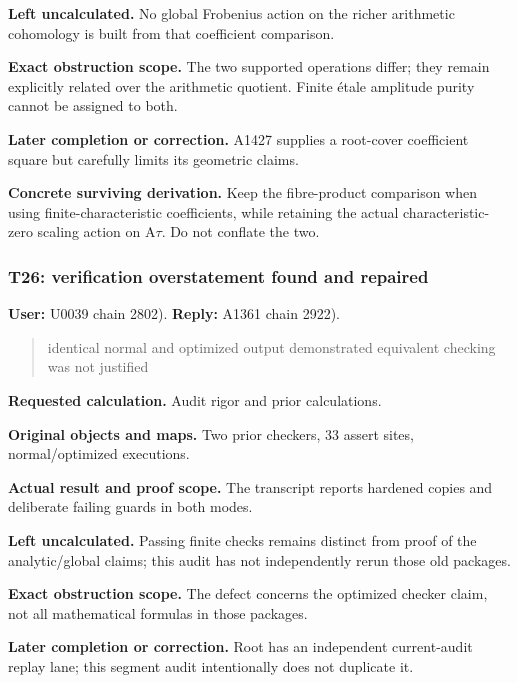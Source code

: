 \textbf{Left uncalculated.} No global Frobenius action on the richer
arithmetic cohomology is built from that coefficient comparison.

\textbf{Exact obstruction scope.} The two supported operations differ;
they remain explicitly related over the arithmetic quotient. Finite
étale amplitude purity cannot be assigned to both.

\textbf{Later completion or correction.} A1427 supplies a root-cover
coefficient square but carefully limits its geometric claims.

\textbf{Concrete surviving derivation.} Keep the fibre-product
comparison when using finite-characteristic coefficients, while
retaining the actual characteristic-zero scaling action on
A\allowbreak{}\ensuremath{τ}\allowbreak{}. Do not conflate the two.

\subsubsection{T26: verification overstatement found and
repaired}\label{TranscriptLedgerStage:t26-verification-overstatement-found-and-repaired}

\textbf{User:} U0039
\protect{} chain 2802).
\textbf{Reply:} A1361
\protect{} chain 2922).

\begin{quote}
identical normal and optimized output demonstrated equivalent checking
was not justified
\end{quote}

\textbf{Requested calculation.} Audit rigor and prior calculations.

\textbf{Original objects and maps.} Two prior checkers, 33 assert sites,
normal/optimized executions.

\textbf{Actual result and proof scope.} The transcript reports hardened
copies and deliberate failing guards in both modes.

\textbf{Left uncalculated.} Passing finite checks remains distinct from
proof of the analytic/global claims; this audit has not independently
rerun those old packages.

\textbf{Exact obstruction scope.} The defect concerns the optimized
checker claim, not all mathematical formulas in those packages.

\textbf{Later completion or correction.} Root has an independent
current-audit replay lane; this segment audit intentionally does not
duplicate it.

